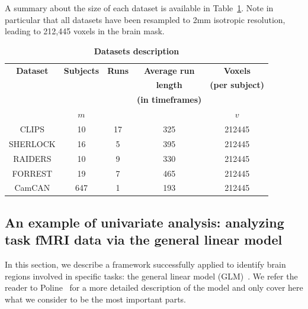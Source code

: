 A summary about the size of each dataset is available in Table~\ref{tab:dataset_desc2}. Note in particular that all datasets have been resampled to 2mm isotropic resolution, leading to 212,445 voxels in the brain mask.
\begin{table}
	\begin{tabular}{|c|c|c|c|c|}
		\hline
		\textbf{Dataset} & \textbf{Subjects} & \textbf{Runs} & \textbf{Average run} & \textbf{Voxels} \\
                     && & \textbf{length} & \textbf{(per subject)} \\
                     && & \textbf{(in timeframes)} &  \\
                     &$m$& $ $ &  &$v$  \\
		\hline
		CLIPS & 10 & 17 & 325 & 212445\\ 
		\hline
		SHERLOCK & 16 & 5 & 395 & 212445 \\ 
		\hline
		RAIDERS & 10 & 9 & 330 & 212445 \\
		\hline 
		FORREST & 19 & 7 & 465 & 212445\\
		\hline
		CamCAN & 647 & 1 & 193 & 212445 \\
		\hline
	\end{tabular}
  \caption{\textbf{Datasets description}}
  \label{tab:dataset_desc2}
\end{table}

\subsection{An example of univariate analysis: analyzing task fMRI data via the general linear model}
\label{sec:glm}
In this section, we describe a framework successfully applied to identify brain regions involved in specific tasks: the general linear model
(GLM)~\cite{friston1995analysis}. We refer the reader to
Poline~\cite{poline2012general} for a more detailed description of the model and only cover here what we consider to be the most important parts.

